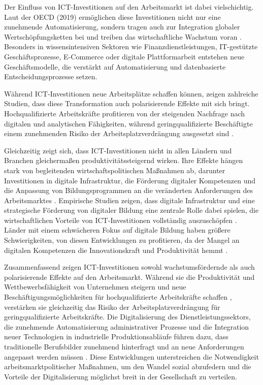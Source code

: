 Der Einfluss von \ac{ICT}-Investitionen auf den Arbeitsmarkt ist dabei vielschichtig. Laut 
der \ac{OECD} (2019) ermöglichen diese Investitionen nicht nur eine zunehmende 
Automatisierung, sondern tragen auch zur Integration globaler Wertschöpfungsketten bei 
und treiben das wirtschaftliche Wachstum voran 
\parencite[vgl.][S. 144]{oecd2019measuring}. Besonders in wissensintensiven Sektoren wie 
Finanzdienstleistungen, \ac{IT}-gestützte Geschäftsprozesse, E-Commerce oder digitale 
Plattformarbeit entstehen neue Geschäftsmodelle, die verstärkt auf Automatisierung und 
datenbasierte Entscheidungsprozesse setzen.

Während \ac{ICT}-Investitionen neue Arbeitsplätze schaffen können, zeigen zahlreiche 
Studien, dass diese Transformation auch polarisierende Effekte mit sich bringt. 
Hochqualifizierte Arbeitskräfte profitieren von der steigenden Nachfrage nach digitalen 
und analytischen Fähigkeiten, während geringqualifizierte Beschäftigte einem zunehmenden 
Risiko der Arbeitsplatzverdrängung ausgesetzt sind 
\parencite[vgl.][Kap. 2]{brynjolfsson2014thesecond}.

Gleichzeitig zeigt sich, dass \ac{ICT}-Investitionen nicht in allen Ländern und Branchen 
gleichermaßen produktivitätssteigernd wirken. Ihre Effekte hängen stark von begleitenden 
wirtschaftspolitischen Maßnahmen ab, darunter Investitionen in digitale Infrastruktur, 
die Förderung digitaler Kompetenzen und die Anpassung von Bildungsprogrammen an die 
veränderten Anforderungen des Arbeitsmarktes 
\parencite[vgl.][Kap. 13]{brynjolfsson2014thesecond}. Empirische 
Studien zeigen, dass digitale Infrastruktur und eine strategische Förderung von digitaler 
Bildung eine zentrale Rolle dabei spielen, die wirtschaftlichen Vorteile von 
\ac{ICT}-Investitionen vollständig auszuschöpfen \parencite[vgl.][S. 357–358]{vu2011ict}. 
Länder mit einem schwächeren Fokus auf digitale Bildung haben größere Schwierigkeiten, 
von diesen Entwicklungen zu profitieren, da der Mangel an digitalen Kompetenzen die 
Innovationskraft und Produktivität hemmt \parencite[vgl.][S. 19]{oecd2020digital}.

Zusammenfassend zeigen \ac{ICT}-Investitionen sowohl wachstumsfördernde als auch 
polarisierende Effekte auf den Arbeitsmarkt. Während sie die Produktivität und 
Wettbewerbsfähigkeit von Unternehmen steigern und neue Beschäftigungsmöglichkeiten für 
hochqualifizierte Arbeitskräfte schaffen \parencite[vgl.][S. 19–20]{oecd2020digital}, 
verstärken sie gleichzeitig das Risiko der Arbeitsplatzverdrängung für geringqualifizierte 
Arbeitskräfte. Die Digitalisierung des Dienstleistungssektors, die zunehmende Automatisierung 
administrativer Prozesse und die Integration neuer Technologien in industrielle 
Produktionsabläufe führen dazu, dass traditionelle Berufsbilder zunehmend hinterfragt und 
an neue Anforderungen angepasst werden müssen \parencite[vgl.][S. 20]{oecd2020digital}. Diese 
Entwicklungen unterstreichen die Notwendigkeit arbeitsmarktpolitischer Maßnahmen, um den 
Wandel sozial abzufedern und die Vorteile der Digitalisierung möglichst breit in der 
Gesellschaft zu verteilen.

